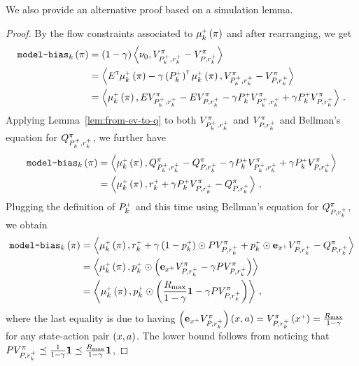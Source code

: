 \noindent We also provide an alternative proof based on a simulation lemma.
%
\begin{proof}
    By the flow constraints associated to $\mu_k^\upplus \spr{\pi}$ and after rearranging, we get
    \begin{align*}
        \modelbias_k \spr{\pi} &= \spr{1 - \gamma} \inp{\nu_0, V_{P_k^\upplus, r_k^\upplus}^\pi - V_{P, r_k^\upplus}^\pi} \\
        &= \inp{\opE\transpose \mu_k^\upplus \spr{\pi} - \gamma \spr{\opPplusk}\transpose \mu_k^\upplus \spr{\pi}, V_{P_k^\upplus, r_k^\upplus}^\pi - V_{P, r_k^\upplus}^\pi} \\
        &= \inp{\mu_k^\upplus \spr{\pi}, \opE V_{P_k^\upplus, r_k^\upplus}^\pi - \opE V_{P, r_k^\upplus}^\pi - \gamma \opPplusk V_{P_k^\upplus, r_k^\upplus}^\pi + \gamma \opPplusk V_{P, r_k^\upplus}^\pi}\,.
    \end{align*}
    Applying Lemma~\ref{lem:from-ev-to-q} to both $V_{P_k^\upplus, r_k^\upplus}^\pi$ and $V_{P, r_k^\upplus}^\pi$ and Bellman's equation for $Q_{P_k^\upplus, r_k^\upplus}^\pi$, we further have    
    \begin{align*}
        \modelbias_k \spr{\pi} &= \inp{\mu_k^\upplus \spr{\pi}, Q_{P_k^\upplus, r_k^\upplus}^\pi - Q_{P, r_k^\upplus}^\pi - \gamma \opPplusk V_{P_k^\upplus, r_k^\upplus}^\pi + \gamma \opPplusk V_{P, r_k^\upplus}^\pi} \\
        &= \inp{\mu_k^\upplus \spr{\pi}, r_k^\upplus + \gamma \opPplusk V_{P, r_k^\upplus}^\pi - Q_{P, r_k^\upplus}^\pi} \,,
    \end{align*}
    Plugging the definition of $P_k^\upplus$ and this time using Bellman's equation for $Q_{P, r_k^\upplus}^\pi$, we obtain
    \begin{align}
        \modelbias_k \spr{\pi} &= \inp{\mu_k^\upplus \spr{\pi}, r_k^\upplus + \gamma \spr{1 - p_k^\upplus} \odot \opP V_{P, r_k^\upplus}^\pi + p_k^\upplus \odot \bfe_{x^\upplus} V_{P, r_k^\upplus}^\pi - Q_{P, r_k^\upplus}^\pi} \nonumber \\
        &= \inp{\mu_k^\upplus \spr{\pi}, p_k^\upplus \odot \spr{\bfe_{x^\upplus} V_{P, r_k^\upplus}^\pi - \gamma \opP V_{P, r_k^\upplus}^\pi}} \nonumber \\
        &= \inp{\mu_k^\upplus \spr{\pi}, p_k^\upplus \odot \spr{\frac{\RMAX}{1 - \gamma} \bfone - \gamma \opP V_{P, r_k^\upplus}^\pi}}\,, \label{eq:hope-decomp}
    \end{align}
    where the last equality is due to having $\spr{\bfe_{x^\upplus} V_{P, r_k^\upplus}^\pi} \spr{x, a} = V_{P, r_k^\upplus}^\pi \spr{x^\upplus} = \frac{\RMAX}{1 - \gamma}$ for any state-action pair $\spr{x, a}$. The lower bound follows from noticing that $\opP V_{P, r_k^\upplus}^\pi \preceq \frac{1}{1 - \gamma} \bfone \preceq \frac{\RMAX}{1 - \gamma} \bfone$,

\end{proof}
